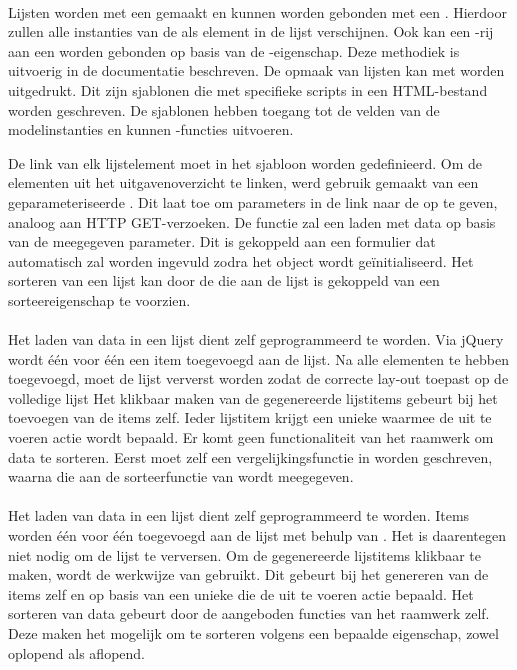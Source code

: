 \paragraph{\kendo}
Lijsten worden met een  gemaakt en kunnen worden gebonden met een .
Hierdoor zullen alle instanties van de  als element in de lijst verschijnen.
Ook kan een \js-rij aan een  worden gebonden op basis van de -eigenschap.
Deze methodiek is uitvoerig in de documentatie beschreven.
De opmaak van lijsten kan met  worden uitgedrukt.
Dit zijn sjablonen die met specifieke scripts in een HTML-bestand worden geschreven.
De sjablonen hebben toegang tot de velden van de modelinstanties en kunnen \js-functies uitvoeren.

De link van elk lijstelement moet in het sjabloon worden gedefinieerd.
Om de elementen uit het uitgavenoverzicht te linken, werd gebruik gemaakt van een geparameteriseerde .
Dit laat toe om parameters in de link naar de  op te geven,  analoog aan HTTP GET-verzoeken.
De functie zal een  laden met data op basis van de meegegeven parameter.
Dit  is gekoppeld aan een formulier dat automatisch zal worden ingevuld zodra het object wordt geïnitialiseerd.
Het sorteren van een lijst kan door de  die aan de lijst is gekoppeld van een sorteereigenschap te voorzien.

\paragraph{\jqm}
Het laden van data in een lijst dient zelf geprogrammeerd te worden.
Via jQuery wordt één voor één een item toegevoegd aan de lijst.
Na alle elementen te hebben toegevoegd, moet de lijst ververst worden zodat \jqm{} de correcte lay-out toepast op de volledige lijst
Het klikbaar maken van de gegenereerde lijstitems gebeurt bij het toevoegen van de items zelf.
Ieder lijstitem krijgt een unieke  waarmee de uit te voeren actie wordt bepaald.
Er komt geen functionaliteit van het raamwerk om data te sorteren.
Eerst moet zelf een vergelijkingsfunctie in \js{} worden geschreven, waarna die aan de sorteerfunctie van \js{} wordt meegegeven.

\paragraph{\lungo}
Het laden van data in een lijst dient zelf geprogrammeerd te worden.
Items worden één voor één toegevoegd aan de lijst met behulp van \quo{}.
Het is daarentegen niet nodig om de lijst te verversen.
Om de gegenereerde lijstitems klikbaar te maken, wordt de werkwijze van \jqm{} gebruikt.
Dit gebeurt bij het genereren van de items zelf en op basis van een unieke  die de uit te voeren actie bepaald.
Het sorteren van data gebeurt door de aangeboden functies van het raamwerk zelf.
Deze maken het mogelijk om te sorteren volgens een bepaalde eigenschap, zowel oplopend als aflopend.


